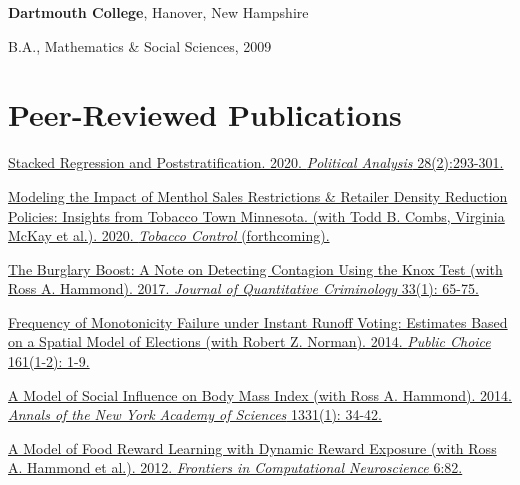 \documentclass[margin,line]{res}
\newenvironment{list1}{
  \begin{list}{}{%
      \setlength{\itemsep}{0.1in}
      \setlength{\parsep}{0in} \setlength{\parskip}{0in}
      \setlength{\topsep}{0.1in} \setlength{\partopsep}{0in} 
      \setlength{\leftmargin}{0.17in}}}{\end{list}}
\newenvironment{publist}{
	\begin{list}{}{%
			\setlength{\itemsep}{0.15in}
			\setlength{\parsep}{0in} \setlength{\parskip}{0in}
			\setlength{\topsep}{0in} \setlength{\partopsep}{0in} 
			\setlength{\leftmargin}{0.15in}
			\setlength{\itemindent}{-0.15in}}}
		{\end{list}}
\begin{document}
\begin{resume}
{\bf Dartmouth College}, Hanover, New Hampshire
\begin{list1}
\item[] B.A., Mathematics \& Social Sciences, 2009
\end{list1}




\section{\sc Peer-Reviewed Publications}

\begin{publist}
	
	\item \href{https://doi.org/10.1017/pan.2019.43}{Stacked Regression and Poststratification. 2020. \textit{Political Analysis} 28(2):293-301.}
	
	\item \href{http://dx.doi.org/10.1136/tobaccocontrol-2019-054986}{Modeling the Impact of Menthol Sales Restrictions \& Retailer Density Reduction Policies: Insights from Tobacco Town Minnesota. (with Todd B. Combs, Virginia McKay et al.). 2020. \textit{Tobacco Control} (forthcoming).}
	
	\item \href{https://joeornstein.github.io/publications/Ornstein-Hammond2017.pdf}{The Burglary Boost: A Note on Detecting Contagion Using the Knox Test (with Ross A. Hammond). 2017. \textit{Journal of Quantitative Criminology} 33(1): 65-75.}
	
	\item \href{https://joeornstein.github.io/publications/Ornstein-Norman-2014/Ornstein-Norman-2014.pdf}{Frequency of Monotonicity Failure under Instant Runoff Voting: Estimates Based on a Spatial Model of Elections (with Robert Z. Norman). 2014. \textit{Public Choice} 161(1-2): 1-9.}
	
	\item \href{https://joeornstein.github.io/publications/Hammond_et_al-2014-Annals_of_the_New_York_Academy_of_Sciences.pdf}{A Model of Social Influence on Body Mass Index (with Ross A. Hammond). 2014. \textit{Annals of the New York Academy of Sciences} 1331(1): 34-42.}
	
	\item \href{https://joeornstein.github.io/publications/Hammond-2012.pdf}{A Model of Food Reward Learning with Dynamic Reward Exposure (with Ross A. Hammond et al.). 2012. \textit{Frontiers in Computational Neuroscience} 6:82.}	
\end{publist}






\end{resume}
\end{document}
